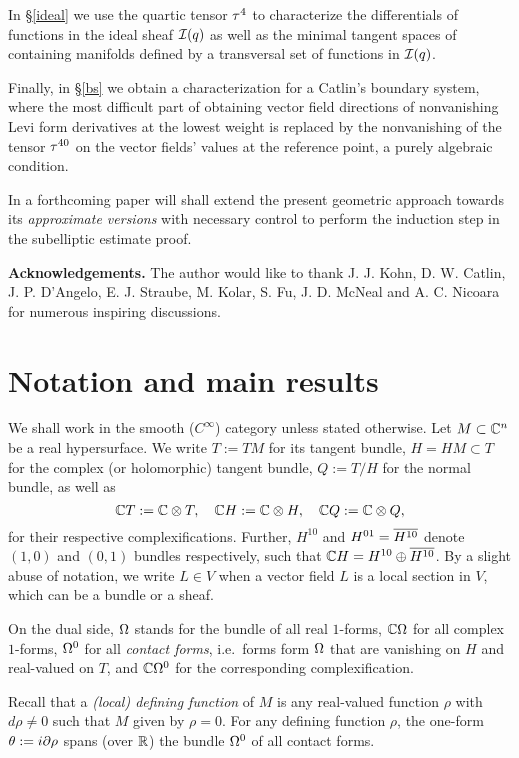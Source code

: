 \documentclass[12pt]{amsart}
\begin{document}
In \S\ref{ideal} we use the quartic tensor $\tau^4$ to 
characterize the differentials of functions in 
the ideal sheaf ${\mathcal{I}}(q)$
as well as the minimal tangent spaces
of containing manifolds
defined by a transversal set of functions in ${\mathcal{I}}(q)$.

Finally, in \S\ref{bs} we obtain a characterization 
for a Catlin's boundary system,
where the most difficult part 
of obtaining vector field directions of nonvanishing Levi form derivatives
at the lowest weight 
is replaced by the nonvanishing of the tensor $\tau^{40}$
on the vector fields' values at the reference point,
a purely algebraic condition.



In a forthcoming paper will shall 
extend the present 
geometric approach 
towards its {\em approximate versions}
with necessary control
to perform the induction step
in the subelliptic estimate proof.

\bigskip

{\bf Acknowledgements.}
The author would like to thank
J. J. Kohn, D. W. Catlin, J. P. D'Angelo,
E. J. Straube, M. Kolar, S. Fu,
J. D. McNeal and A. C. Nicoara
for numerous inspiring discussions.




\section{Notation and main results}
We shall work in the smooth ($C^\infty$) category
unless stated otherwise.
Let $M\subset {\mathbb{C}}^{n}$ be a real hypersurface.
We write $T:= TM$ for its tangent bundle, 
$H = HM \subset  T$ for the complex (or holomorphic) tangent bundle,
$Q:= T/H$ for the normal bundle,
as well as 
$$
	{\mathbb{C}} T := {\mathbb{C}}\otimes T,
	\quad 
	{\mathbb{C}} H: ={\mathbb{C}}\otimes H,
	\quad
	{\mathbb{C}} Q:= {\mathbb{C}}\otimes Q,
$$
for their respective complexifications.
Further, $H^{10}$ and $H^{01}= \overline{H^{10}}$ denote $(1,0)$ and $(0,1)$ bundles respectively, such that ${\mathbb{C}} H = H^{10}\oplus \overline{H^{10}}$.
By a slight abuse of notation, we write $L\in V$
when a vector field $L$ is a local section in $V$,
which can be a bundle or a sheaf.

On the dual side, 
$\Omega$ stands for the bundle of all real $1$-forms, 
${\mathbb{C}} \Omega$ for all complex $1$-forms,
$\Omega^0$ for all {\em contact forms}, 
i.e.\ forms form $\Omega$ that are vanishing on $H$ and real-valued on $T$,
and ${\mathbb{C}}\Omega^0$ for the corresponding complexification.

Recall that a {\em (local) defining function} of $M$
is any real-valued function $\rho$ with $d\rho\ne 0$ such that $M$ given by 
$\rho=0$. For any defining function $\rho$, the one-form 
$\theta: = i\partial\rho$ 
spans (over ${\mathbb{R}}$) the bundle $\Omega^0$ of all contact forms. 
 
\end{document}
